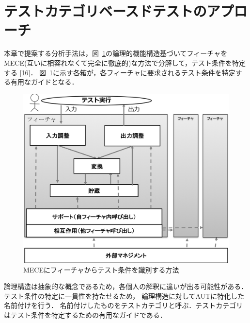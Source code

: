 \documentclass[a4paper,12pt]{jreport}
\begin{document}
\section{テストカテゴリベースドテストのアプローチ}
本章で提案する分析手法は，図~\ref{fig:D-3-Fig3}の論理的機能構造基づいてフィーチャをMECE(互いに相容れなくて完全に徹底的)な方法で分解して，テスト条件を特定する [16]．
図~\ref{fig:D-3-Fig3}に示す各箱が，各フィーチャに要求されるテスト条件を特定する有用なガイドとなる．
\begin{figure}[h]
  \begin{center}
  \includegraphics[width=12cm]{./image/D-3-Fig3.png}
  \caption{MECEにフィーチャからテスト条件を識別する方法}
  \label{fig:D-3-Fig3}
  \end{center}
   \end{figure}

 論理構造は抽象的な概念であるため，各個人の解釈に違いが出る可能性がある．テスト条件の特定に一貫性を持たせるため， 論理構造に対してAUTに特化した名前付けを行う．
名前付けしたものをテストカテゴリと呼ぶ．テストカテゴリはテスト条件を特定するための有用なガイドである．
\end{document}
